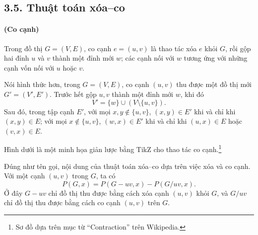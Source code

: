 \documentclass[11pt]{article}
\begin{document}
\subsection*{3.5. Thuật toán xóa--co}

\paragraph{ (Co cạnh)}
Trong đồ thị \(G=(V,E)\), co cạnh \(e=(u,v)\) là thao tác xóa \(e\) khỏi
\(G\), rồi gộp hai đỉnh \(u\) và \(v\) thành một đỉnh mới \(w\); các cạnh nối
với \(w\) tương ứng với những cạnh vốn nối với \(u\) hoặc \(v\).

Nói hình thức hơn, trong \(G=(V,E)\), co cạnh \((u,v)\) thu được một đồ thị
mới \(G'=(V',E')\). Trước hết gộp \(u,v\) thành một đỉnh mới \(w\), khi đó
\[
  V'=\{w\}\cup(V\setminus\{u,v\}).
\]
Sau đó, trong tập cạnh \(E'\), với mọi \(x,y\notin\{u,v\}\), \((x,y)\in E'\)
khi và chỉ khi \((x,y)\in E\); với mọi \(x\notin\{u,v\}\), \((w,x)\in E'\)
khi và chỉ khi \((u,x)\in E\) hoặc \((v,x)\in E\).

Hình dưới là một minh họa giản lược bằng TikZ cho thao tác co cạnh.\footnote{Sơ
đồ dựa trên mục từ ``Contraction'' trên Wikipedia.}

\begin{center}
\end{center}

Đúng như tên gọi, nội dung của thuật toán xóa--co dựa trên việc xóa và co
cạnh. Với một cạnh \((u,v)\) trong \(G\), ta có
\[
  P(G,x)=P(G-uv,x)-P(G/uv,x). \tag{2}
\]
Ở đây \(G-uv\) chỉ đồ thị thu được bằng cách xóa cạnh \((u,v)\) khỏi \(G\), và
\(G/uv\) chỉ đồ thị thu được bằng cách co cạnh \((u,v)\) trên \(G\).
\end{document}
